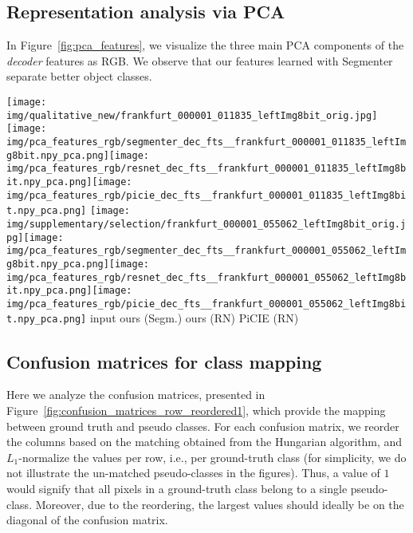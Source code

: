 \documentclass[runningheads]{llncs}
\begin{document}
\subsection{Representation analysis via PCA}

In Figure~\ref{fig:pca_features}, we visualize the three main PCA components of the \emph{decoder} features as RGB. We observe that our features learned with Segmenter separate better object classes.

\begin{figure*}[t!]
    \centering
    \texttt{[image: img/qualitative\_new/frankfurt\_000001\_011835\_leftImg8bit\_orig.jpg]}\texttt{[image: img/pca\_features\_rgb/segmenter\_dec\_fts\_\_frankfurt\_000001\_011835\_leftImg8bit.npy\_pca.png]}\texttt{[image: img/pca\_features\_rgb/resnet\_dec\_fts\_\_frankfurt\_000001\_011835\_leftImg8bit.npy\_pca.png]}\texttt{[image: img/pca\_features\_rgb/picie\_dec\_fts\_\_frankfurt\_000001\_011835\_leftImg8bit.npy\_pca.png]}
    \texttt{[image: img/supplementary/selection/frankfurt\_000001\_055062\_leftImg8bit\_orig.jpg]}\texttt{[image: img/pca\_features\_rgb/segmenter\_dec\_fts\_\_frankfurt\_000001\_055062\_leftImg8bit.npy\_pca.png]}\texttt{[image: img/pca\_features\_rgb/resnet\_dec\_fts\_\_frankfurt\_000001\_055062\_leftImg8bit.npy\_pca.png]}\texttt{[image: img/pca\_features\_rgb/picie\_dec\_fts\_\_frankfurt\_000001\_055062\_leftImg8bit.npy\_pca.png]}
    {
    \hspace*{0.6cm}
    {input}\hspace{1.6cm}
    {ours (Segm.)}\hspace{1.35cm}
    {ours (RN)}\hspace{1.35cm}
    {PiCIE (RN)}
    }
    \caption{\textbf{Feature visualization}. 
    We do PCA analysis of the pixel-wise decoder features from each image (independenly between the different images) and visualize the three first PCA components as an RGB image.
    `Segm.' stands for Segmenter with ViT-S/16 and `RN' for ResNet18+FPN.}
    \label{fig:pca_features}
\end{figure*}




\subsection{Confusion matrices for class mapping}
\label{sec:confusion}
Here we analyze the confusion matrices, presented in Figure~\ref{fig:confusion_matrices_row_reordered1}, which provide the mapping between ground truth and pseudo classes.
For each confusion matrix, we reorder the columns based on the matching obtained from the Hungarian algorithm, and $L_1$-normalize the values per row, i.e., per ground-truth class (for simplicity, we do not illustrate the un-matched pseudo-classes in the figures).
Thus, a value of $1$ would signify that all pixels in a ground-truth class belong to a single pseudo-class. 
Moreover, due to the reordering, the largest values should ideally be on the diagonal of the confusion matrix. 
\end{document}

